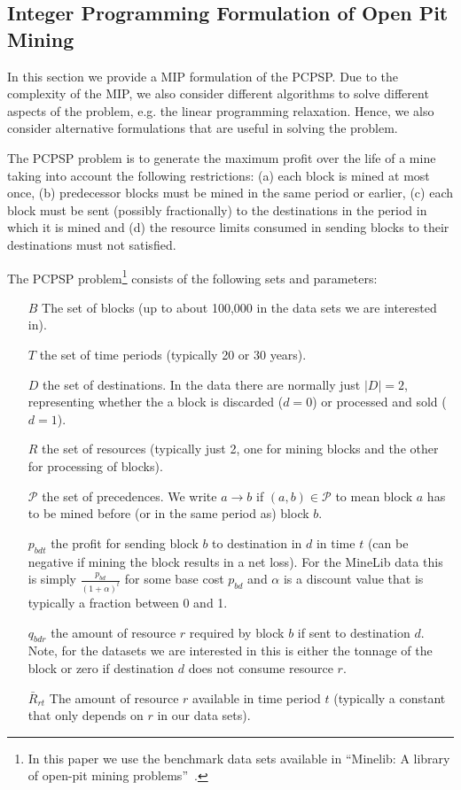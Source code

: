 \documentclass[authoryear,11pt,square,number,times,super,comma]{elsarticle}
\begin{document}
\subsection{Integer Programming Formulation of Open Pit Mining}\label{sec:formulations}

In this section we provide a MIP formulation of the PCPSP. Due to the complexity of the MIP, we also consider different algorithms to solve different aspects of the problem, e.g. the linear programming relaxation. Hence, we also consider alternative formulations that are useful in solving the problem. 

The PCPSP problem is to generate the maximum profit over the life of a mine taking into account the following restrictions: (a) each block is mined at most once, (b) predecessor blocks must be mined in the same period or earlier, (c) each block must be sent (possibly fractionally) to the destinations in  the period in which it is mined and (d) the resource limits consumed in sending blocks to their destinations must not satisfied.

The PCPSP problem\footnote{In this paper we use the benchmark data sets available in ``Minelib: A library of open-pit mining problems''~\citep{espinoza_minelib:_2012}.} consists of the following sets and parameters:
\begin{enumerate}
\item[$B$] The set of blocks (up to about 100,000 in the data sets we are
  interested in).
\item[$T$] the set of time periods (typically 20 or 30 years).
\item[$D$] the set of destinations. In the data there are normally just
  $|D|=2$, representing whether the  a block is discarded ($d=0$) or processed
  and sold ($d=1$).
\item[$R$] the set of resources (typically just 2, one for mining blocks and
  the other for processing of blocks).
\item[$\mathcal{P}$] the set of precedences. We write $a\rightarrow b$ if
  $(a,b)\in \mathcal{P}$ to mean block $a$ has to be mined before (or in the
  same period as) block $b$.
\item[$p_{bdt}$] the profit for sending block $b$ to destination in $d$ in
  time $t$ (can be negative if mining the block results in a net loss). For the
  MineLib data this is simply $\frac{p_{bd}}{(1+\alpha)^t}$ for
  some base cost $p_{bd}$ and $\alpha$ is a discount value that is typically a fraction between 0 and 1.
\item[$q_{bdr}$] the amount of resource $r$ required by block $b$ if sent to
  destination $d$. Note, for the datasets we are interested in this is either
  the tonnage of the block or zero if destination $d$ does not consume resource $r$.
\item[$\bar R_{rt}$] The amount of resource $r$ available in time period $t$
  (typically a constant that only depends on $r$ in our data sets).
\end{enumerate}
\end{document}
